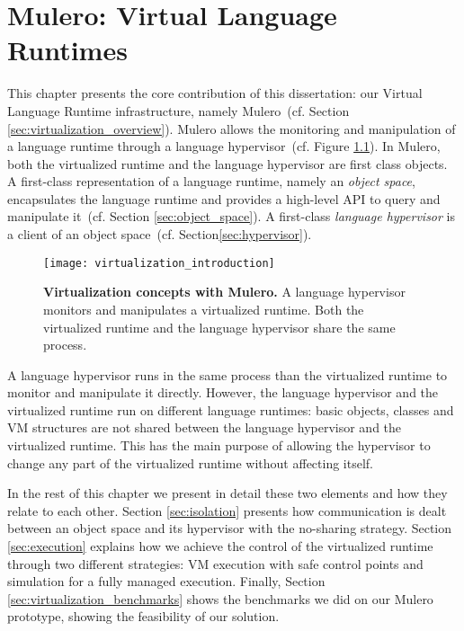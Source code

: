 
\newcommand{\VTT}{Mulero\xspace}
\newcommand{\Vtt}{\VTT}
\newcommand{\VT}{\VTT}
\newcommand{\Vt}{\VTT}

\chapter{\VTT: Virtual Language Runtimes}
\minitoc
\introduction

This chapter presents the core contribution of this dissertation: our Virtual Language Runtime infrastructure, namely \VTT~(cf. Section \ref{sec:virtualization_overview}). \VTT allows the monitoring and manipulation of a language runtime through a language hypervisor~(cf. Figure \ref{fig:virtualization_introduction}). In \VTT, both the virtualized runtime and the language hypervisor are first class objects. A first-class representation of a language runtime, namely an \emph{object space}, encapsulates the language runtime and provides a high-level API to query and manipulate it~(cf. Section \ref{sec:object_space}). A first-class \emph{language hypervisor} is a client of an object space~(cf. Section\ref{sec:hypervisor}).

\begin{figure}[htb]
\begin{center}
\texttt{[image: virtualization\_introduction]}
\caption{\textbf{Virtualization concepts with \Vtt.} A language hypervisor monitors and manipulates a virtualized runtime. Both the virtualized runtime and the language hypervisor share the same process.\label{fig:virtualization_introduction}}
\end{center}
\end{figure}

A language hypervisor runs in the same process than the virtualized runtime to monitor and manipulate it directly. However, the language hypervisor and the virtualized runtime run on different language runtimes: basic objects, classes and VM structures are not shared between the language hypervisor and the virtualized runtime. This has the main purpose of allowing the hypervisor to change any part of the virtualized runtime without affecting itself.

In the rest of this chapter we present in detail these two elements and how they relate to each other. Section \ref{sec:isolation} presents how communication is dealt between an object space and its hypervisor with the no-sharing strategy. Section \ref{sec:execution} explains how we achieve the control of the virtualized runtime through two different strategies: VM execution with safe control points and simulation for a fully managed execution. Finally, Section \ref{sec:virtualization_benchmarks} shows the benchmarks we did on our \Vtt prototype, showing the feasibility of our solution.

